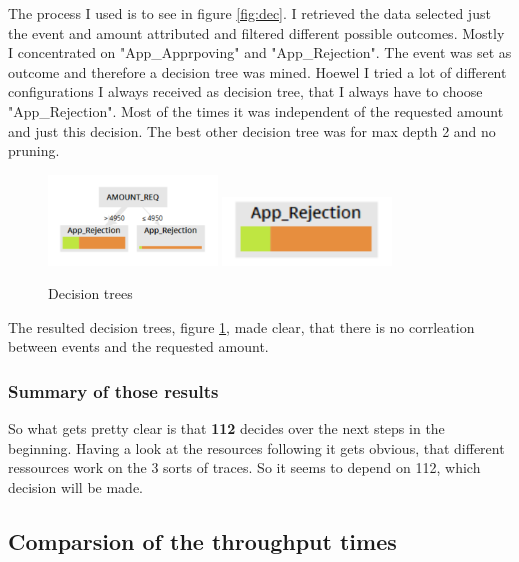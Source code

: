 The process I used is to see in figure \ref{fig:dec}. I retrieved the data selected just the event and amount attributed and filtered different possible outcomes. Mostly I concentrated on "App\_Apprpoving" and "App\_Rejection". The event was set as outcome and therefore a decision tree was mined. Hoewel I tried a lot of different configurations I always received as decision tree, that I always have to choose "App\_Rejection". Most of the times it was independent of the requested amount and just this decision. The best other decision tree was for max depth 2 and no pruning.

\begin{figure}[!htbp]
\centering
\includegraphics[width=0.4\textwidth]{AmoutReqDec.PNG}
\includegraphics[width=0.4\textwidth]{AmoutReqDec2.PNG}
\caption{Decision trees}
\label{fig:DecTre}
\end{figure}

The resulted decision trees, figure \ref{fig:DecTre}, made clear, that there is no corrleation between events and the requested amount.

\subsubsection{Summary of those results}

So what gets pretty clear is that \textbf{112} decides over the next steps in the beginning. Having a look at the resources following it gets obvious, that different ressources work on the 3 sorts of traces. So it seems to depend on 112, which decision will be made.


\subsection{Comparsion of the throughput times}

